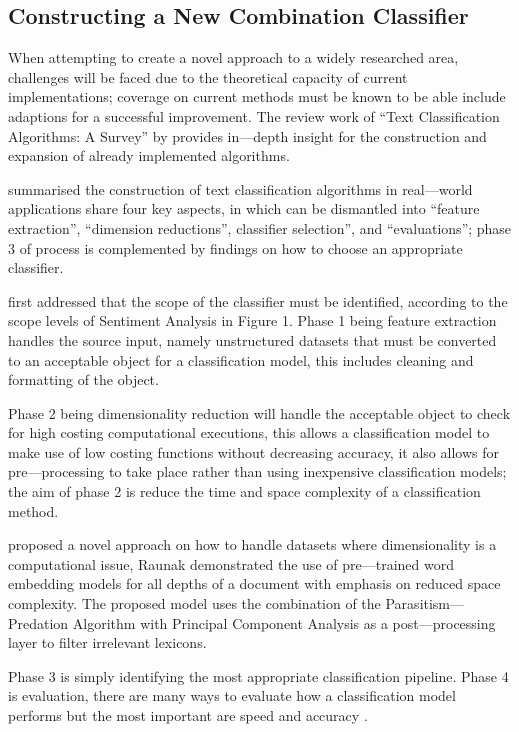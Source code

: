 \subsection{Constructing a New Combination Classifier}

When attempting to create a novel approach to a widely researched area, challenges will be faced due to the theoretical capacity of current implementations; coverage on current methods must be known to be able include adaptions for a successful improvement. The review work of “Text Classification Algorithms: A Survey” by \parencite{kowsari2019text} provides in---depth insight for the construction and expansion of already implemented algorithms.

\textcite{kowsari2019text} summarised the construction of text classification algorithms in real---world applications share four key aspects, in which can be dismantled into “feature extraction”, “dimension reductions”, classifier selection”, and “evaluations”; phase 3 of \textcite{kowsari2019text} process is complemented by \textcite{enriquez2013comparative} findings on how to choose an appropriate classifier.

\textcite{kowsari2019text} first addressed that the scope of the classifier must be identified, according to the scope levels of Sentiment Analysis in Figure 1. Phase 1 being feature extraction handles the source input, namely unstructured datasets that must be converted to an acceptable object for a classification model, this includes cleaning and formatting of the object.

Phase 2 being dimensionality reduction will handle the acceptable object to check for high costing computational executions, this allows a classification model to make use of low costing functions without decreasing accuracy, it also allows for pre---processing to take place rather than using inexpensive classification models; the aim of phase 2 is reduce the time and space complexity of a classification method.

\textcite{raunak2019effective} proposed a novel approach on how to handle datasets where dimensionality is a computational issue, Raunak demonstrated the use of pre---trained word embedding models for all depths of a document with emphasis on reduced space complexity. The proposed model uses the combination of the Parasitism---Predation Algorithm with Principal Component Analysis as a post---processing layer to filter irrelevant lexicons.

Phase 3 is simply identifying the most appropriate classification pipeline. Phase 4 is evaluation, there are many ways to evaluate how a classification model performs but the most important are speed and accuracy \textcite{kowsari2019text}.

